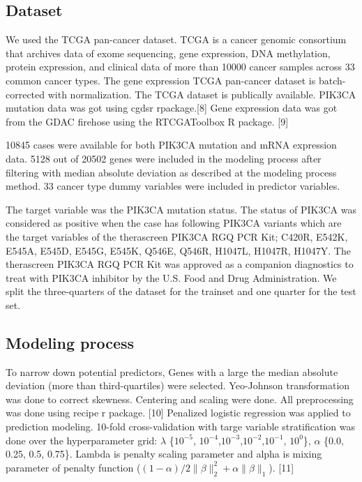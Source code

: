 \documentclass[10pt,letterpaper]{article}
\begin{document}
\hypertarget{dataset}{%
\subsection{Dataset}\label{dataset}}

We used the TCGA pan-cancer dataset. TCGA is a cancer genomic consortium
that archives data of exome sequencing, gene expression, DNA
methylation, protein expression, and clinical data of more than 10000
cancer samples across 33 common cancer types. The gene expression TCGA
pan-cancer dataset is batch-corrected with normalization. The TCGA
dataset is publically available. PIK3CA mutation data was got using
cgdsr rpackage.{[}8{]} Gene expression data was got from the GDAC
firehose using the RTCGAToolbox R package. {[}9{]}

10845 cases were available for both PIK3CA mutation and mRNA expression
data. 5128 out of 20502 genes were included in the modeling process
after filtering with median absolute deviation as described at the
modeling process method. 33 cancer type dummy variables were included in
predictor variables.

The target variable was the PIK3CA mutation status. The status of PIK3CA
was considered as positive when the case has following PIK3CA variants
which are the target variables of the therascreen PIK3CA RGQ PCR Kit;
C420R, E542K, E545A, E545D, E545G, E545K, Q546E, Q546R, H1047L, H1047R,
H1047Y. The therascreen PIK3CA RGQ PCR Kit was approved as a companion
diagnostics to treat with PIK3CA inhibitor by the U.S. Food and Drug
Administration. We split the three-quarters of the dataset for the
trainset and one quarter for the test set.

\hypertarget{modeling-process}{%
\subsection{Modeling process}\label{modeling-process}}

To narrow down potential predictors, Genes with a large the median
absolute deviation (more than third-quartiles) were selected.
Yeo-Johnson transformation was done to correct skewness. Centering and
scaling were done. All preprocessing was done using recipe r package.
{[}10{]} Penalized logistic regression was applied to prediction
modeling. 10-fold cross-validation with targe variable stratification
was done over the hyperparameter grid: \(\lambda\) \{\(10^{-5}\),
\(10^{-4}\),\(10^{-3}\),\(10^{-2}\),\(10^{-1}\), \(10^{0}\)\},
\(\alpha\) \{0.0, 0.25, 0.5, 0.75\}. Lambda is penalty scaling parameter
and alpha is mixing parameter of penalty function
(\((1-\alpha)/2 \lVert\beta\rVert_2^2+\alpha\lVert \beta \rVert_1\)).
{[}11{]}
\end{document}
